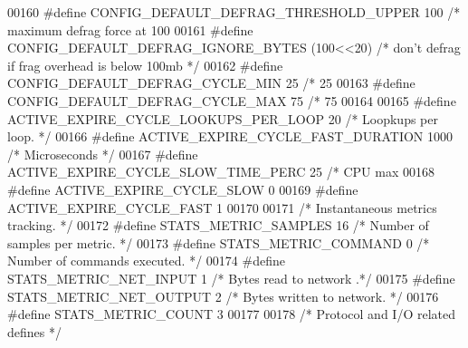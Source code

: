 \begin{DoxyCode}
{00160 \textcolor{preprocessor}{#}\textcolor{preprocessor}{define} \textcolor{preprocessor}{CONFIG\_DEFAULT\_DEFRAG\_THRESHOLD\_UPPER} 100 \textcolor{comment}{/* maximum defrag force at 100%
00161 \textcolor{preprocessor}{#}\textcolor{preprocessor}{define} \textcolor{preprocessor}{CONFIG\_DEFAULT\_DEFRAG\_IGNORE\_BYTES} \textcolor{preprocessor}{(}100\textcolor{preprocessor}{<<}20\textcolor{preprocessor}{)} \textcolor{comment}{/* don't defrag if frag overhead is below 100mb
       */}
00162 \textcolor{preprocessor}{#}\textcolor{preprocessor}{define} \textcolor{preprocessor}{CONFIG\_DEFAULT\_DEFRAG\_CYCLE\_MIN} 25 \textcolor{comment}{/* 25%
00163 \textcolor{preprocessor}{#}\textcolor{preprocessor}{define} \textcolor{preprocessor}{CONFIG\_DEFAULT\_DEFRAG\_CYCLE\_MAX} 75 \textcolor{comment}{/* 75%
00164 
00165 \textcolor{preprocessor}{#}\textcolor{preprocessor}{define} \textcolor{preprocessor}{ACTIVE\_EXPIRE\_CYCLE\_LOOKUPS\_PER\_LOOP} 20 \textcolor{comment}{/* Loopkups per loop. */}
00166 \textcolor{preprocessor}{#}\textcolor{preprocessor}{define} \textcolor{preprocessor}{ACTIVE\_EXPIRE\_CYCLE\_FAST\_DURATION} 1000 \textcolor{comment}{/* Microseconds */}
00167 \textcolor{preprocessor}{#}\textcolor{preprocessor}{define} \textcolor{preprocessor}{ACTIVE\_EXPIRE\_CYCLE\_SLOW\_TIME\_PERC} 25 \textcolor{comment}{/* CPU max %
00168 \textcolor{preprocessor}{#}\textcolor{preprocessor}{define} \textcolor{preprocessor}{ACTIVE\_EXPIRE\_CYCLE\_SLOW} 0
00169 \textcolor{preprocessor}{#}\textcolor{preprocessor}{define} \textcolor{preprocessor}{ACTIVE\_EXPIRE\_CYCLE\_FAST} 1
00170 
00171 \textcolor{comment}{/* Instantaneous metrics tracking. */}
00172 \textcolor{preprocessor}{#}\textcolor{preprocessor}{define} \textcolor{preprocessor}{STATS\_METRIC\_SAMPLES} 16     \textcolor{comment}{/* Number of samples per metric. */}
00173 \textcolor{preprocessor}{#}\textcolor{preprocessor}{define} \textcolor{preprocessor}{STATS\_METRIC\_COMMAND} 0      \textcolor{comment}{/* Number of commands executed. */}
00174 \textcolor{preprocessor}{#}\textcolor{preprocessor}{define} \textcolor{preprocessor}{STATS\_METRIC\_NET\_INPUT} 1    \textcolor{comment}{/* Bytes read to network .*/}
00175 \textcolor{preprocessor}{#}\textcolor{preprocessor}{define} \textcolor{preprocessor}{STATS\_METRIC\_NET\_OUTPUT} 2   \textcolor{comment}{/* Bytes written to network. */}
00176 \textcolor{preprocessor}{#}\textcolor{preprocessor}{define} \textcolor{preprocessor}{STATS\_METRIC\_COUNT} 3
00177 
00178 \textcolor{comment}{/* Protocol and I/O related defines */}
}}}}}
\end{DoxyCode}
